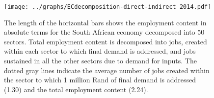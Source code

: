 \documentclass[12pt,english]{article}
\begin{document}
\begin{figure}[!ht]
	\centering
	\thispagestyle{empty}
	\texttt{[image: ../graphs/ECdecomposition-direct-indirect\_2014.pdf]}
	\caption{\label{Decomposition_direct_indirect_absolute} The length of the horizontal bars shows the employment content in absolute terms for the South African economy decomposed into 50 sectors. %
		Total employment content is decomposed into jobs, created within each sector to which final demand is addressed, and jobs sustained in all the other sectors due to demand for inputs. The dotted gray lines indicate the average number of jobs created within the sector to which 1 million Rand of final demand is addressed (1.30) and the total employment content (2.24).}
\end{figure}	


\clearpage
%
%
%
\end{document}
